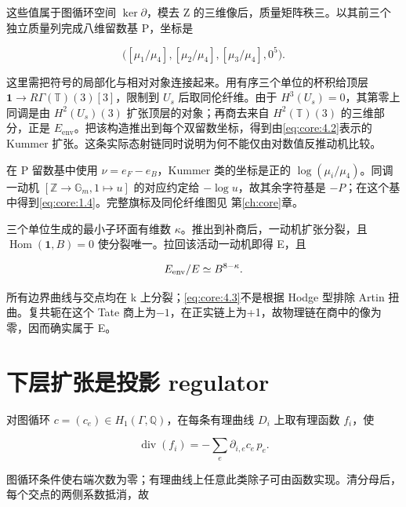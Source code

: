 \documentclass[11pt,a4paper,oneside]{ctexrep}
\theoremstyle{cnplain}
\theoremstyle{definition}
\theoremstyle{remark}
\begin{document}
这些值属于图循环空间 \(\ker\partial\)，模去 Z 的三维像后，质量矩阵秩三。以其前三个独立质量列完成八维留数基 P，坐标是

\begin{equation}
\bigl([\mu_1/\mu_4],[\mu_2/\mu_4],[\mu_3/\mu_4],0^5\bigr).
                                                               \label{eq:core:4.2}
\end{equation}

这里需把符号的局部化与相对对象连接起来。用有序三个单位的杯积给顶层 \(\mathbf1\to R\Gamma(\mathbb T)(3)[3]\)，限制到 \(U_s\) 后取同伦纤维。由于 \(H^3(U_s)=0\)，其第零上同调是由 \(H^2(U_s)(3)\) 扩张顶层的对象；再商去来自 \(H^2(\mathbb T)(3)\) 的三维部分，正是 \(E_{\mathrm{env}}\)。把该构造推出到每个双留数坐标，得到由\eqref{eq:core:4.2}表示的 Kummer 扩张。这条实际态射链同时说明为何不能仅由对数值反推动机比较。

在 P 留数基中使用 \(\nu=e_F-e_B\)，Kummer 类的坐标是正的 \(\log(\mu_i/\mu_4)\)。同调一动机 \([\mathbb Z\to\mathbb G_m,1\mapsto u]\) 的对应约定给 \(-\log u\)，故其余字符基是 \(- P\)；在这个基中得到\eqref{eq:core:1.4}。完整旗标及同伦纤维图见 第\ref{ch:core}章。

三个单位生成的最小子环面有维数 \(\kappa \)。推出到补商后，一动机扩张分裂，且 \(\operatorname{Hom}(\mathbf1,B)=0\) 使分裂唯一。拉回该活动一动机即得 E，且

\begin{equation}
E_{\rm env}/E\simeq B^{8-\kappa}.    \label{eq:core:4.3}
\end{equation}

所有边界曲线与交点均在 k 上分裂；\eqref{eq:core:4.3}不是根据 Hodge 型排除 Artin 扭曲。复共轭在这个 Tate 商上为\(- 1\)，在正实链上为+1，故物理链在商中的像为零，因而确实属于 E。

\section{下层扩张是投影 regulator}\label{sec:core:5}

对图循环 \(c=(c_e)\in H_1(\Gamma,\mathbb Q)\)，在每条有理曲线 \(D_i\) 上取有理函数 \(f_i\)，使

\begin{equation}
\operatorname{div}(f_i)=-\sum_e\partial_{i,e}c_e\,p_e.
                                                               \label{eq:core:5.1}
\end{equation}

图循环条件使右端次数为零；有理曲线上任意此类除子可由函数实现。清分母后，每个交点的两侧系数抵消，故
\end{document}
